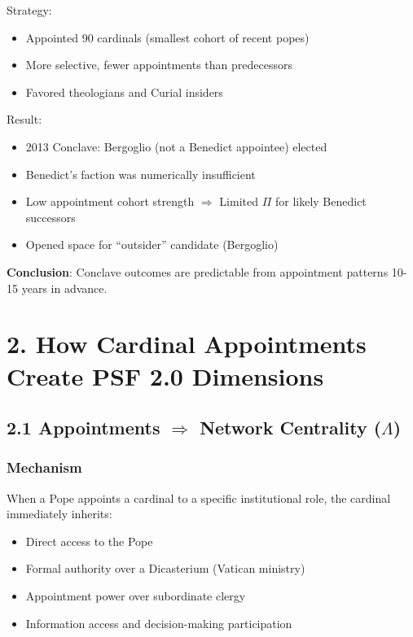 \documentclass[11pt]{article}
\begin{document}
Strategy:
\begin{itemize}
\item Appointed 90 cardinals (smallest cohort of recent popes)
\item More selective, fewer appointments than predecessors
\item Favored theologians and Curial insiders
\end{itemize}

Result:
\begin{itemize}
\item 2013 Conclave: Bergoglio (not a Benedict appointee) elected
\item Benedict's faction was numerically insufficient
\item Low appointment cohort strength $\Rightarrow$ Limited $\Pi$ for likely Benedict successors
\item Opened space for ``outsider'' candidate (Bergoglio)
\end{itemize}

\textbf{Conclusion}: Conclave outcomes are predictable from appointment patterns 10-15 years in advance.

\section{2. How Cardinal Appointments Create PSF 2.0 Dimensions}

\subsection{2.1 Appointments $\Rightarrow$ Network Centrality ($\Lambda$)}

\subsubsection{Mechanism}

When a Pope appoints a cardinal to a specific institutional role, the cardinal immediately inherits:
\begin{itemize}
\item Direct access to the Pope
\item Formal authority over a Dicasterium (Vatican ministry)
\item Appointment power over subordinate clergy
\item Information access and decision-making participation
\end{itemize}
\end{document}
